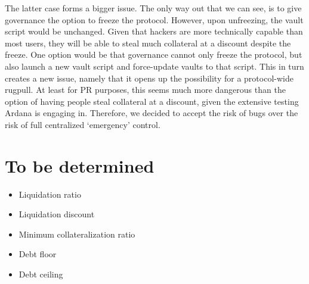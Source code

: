 \documentclass{article} %
\begin{document}
The latter case forms a bigger issue.
The only way out that we can see, is to give governance the option to freeze the
protocol.
However, upon unfreezing, the vault script would be unchanged.
Given that hackers are more technically capable than most users, they will be
able to steal much collateral at a discount despite the freeze.
One option would be that governance cannot only freeze the protocol, but also
launch a new vault script and force-update vaults to that script.
This in turn creates a new issue, namely that it opens up the possibility for a
protocol-wide rugpull.
At least for PR purposes, this seems much more dangerous than the option of
having people steal collateral at a discount, given the extensive testing Ardana
is engaging in.
Therefore, we decided to accept the risk of bugs over the risk of full
centralized `emergency' control.

\section{To be determined}

\begin{itemize}
  \item Liquidation ratio
  \item Liquidation discount
  \item Minimum collateralization ratio
  \item Debt floor
  \item Debt ceiling
\end{itemize}
\end{document}
